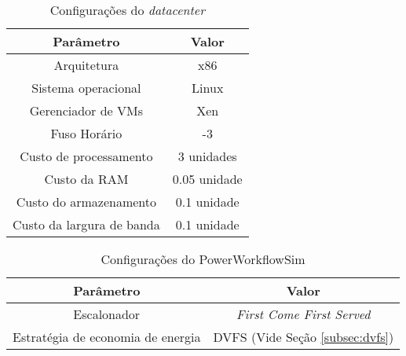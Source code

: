 
\begin{savenotes}
\begin{table}[ht]
	\centering
    \begin{tabular}{|c|c|}
    \hline
    \textbf{Parâmetro}        & \textbf{Valor}     \\ \hline
    Arquitetura               & x86          \\
    Sistema operacional       & Linux        \\
    Gerenciador de VMs        & Xen          \\
    Fuso Horário              & -3           \\
    Custo de processamento    & 3 unidades\footnotemark[3]   \\
    Custo da RAM              & 0.05 unidade\footnotemark[3]  \\
    Custo do armazenamento    & 0.1 unidade\footnotemark[3]  \\
    Custo da largura de banda & 0.1 unidade\footnotemark[3]  \\ \hline
    \end{tabular}
    \caption {Configurações do \emph{datacenter}}
    \label{tab:configuracao_datacenter}
\end{table}
\end{savenotes}


\begin{table}[ht]
	\centering
    \begin{tabular}{|c|c|}
    \hline
    \textbf{Parâmetro}                & \textbf{Valor}     \\ \hline
    Escalonador                       & \emph{First Come First Served}    \\
    Estratégia de economia de energia & DVFS (Vide Seção \ref{subsec:dvfs}) \\ \hline
    \end{tabular}
    \caption {Configurações do PowerWorkflowSim}
    \label{tab:configuracao_powerworkflowsim}
\end{table}



